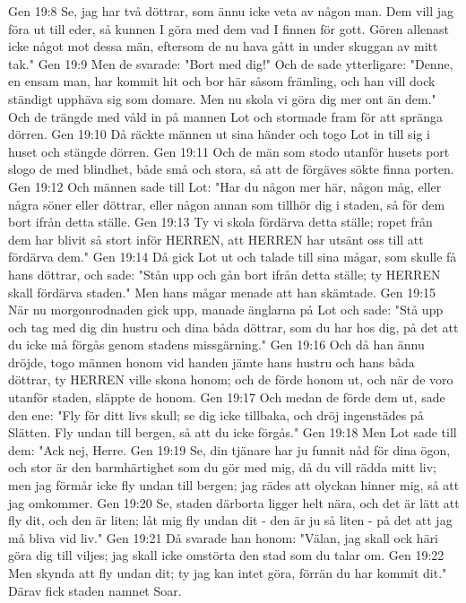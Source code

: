 Gen 19:8  Se, jag har två döttrar, som ännu icke veta av någon man. Dem vill jag föra ut till eder, så kunnen I göra med dem vad I finnen för gott. Gören allenast icke något mot dessa män, eftersom de nu hava gått in under skuggan av mitt tak."
Gen 19:9  Men de svarade: "Bort med dig!" Och de sade ytterligare: "Denne, en ensam man, har kommit hit och bor här såsom främling, och han vill dock ständigt upphäva sig som domare. Men nu skola vi göra dig mer ont än dem." Och de trängde med våld in på mannen Lot och stormade fram för att spränga dörren.
Gen 19:10  Då räckte männen ut sina händer och togo Lot in till sig i huset och stängde dörren.
Gen 19:11  Och de män som stodo utanför husets port slogo de med blindhet, både små och stora, så att de förgäves sökte finna porten.
Gen 19:12  Och männen sade till Lot: "Har du någon mer här, någon måg, eller några söner eller döttrar, eller någon annan som tillhör dig i staden, så för dem bort ifrån detta ställe.
Gen 19:13  Ty vi skola fördärva detta ställe; ropet från dem har blivit så stort inför HERREN, att HERREN har utsänt oss till att fördärva dem."
Gen 19:14  Då gick Lot ut och talade till sina mågar, som skulle få hans döttrar, och sade: "Stån upp och gån bort ifrån detta ställe; ty HERREN skall fördärva staden." Men hans mågar menade att han skämtade.
Gen 19:15  När nu morgonrodnaden gick upp, manade änglarna på Lot och sade: "Stå upp och tag med dig din hustru och dina båda döttrar, som du har hos dig, på det att du icke må förgås genom stadens missgärning."
Gen 19:16  Och då han ännu dröjde, togo männen honom vid handen jämte hans hustru och hans båda döttrar, ty HERREN ville skona honom; och de förde honom ut, och när de voro utanför staden, släppte de honom.
Gen 19:17  Och medan de förde dem ut, sade den ene: "Fly för ditt livs skull; se dig icke tillbaka, och dröj ingenstädes på Slätten. Fly undan till bergen, så att du icke förgås."
Gen 19:18  Men Lot sade till dem: "Ack nej, Herre.
Gen 19:19  Se, din tjänare har ju funnit nåd för dina ögon, och stor är den barmhärtighet som du gör med mig, då du vill rädda mitt liv; men jag förmår icke fly undan till bergen; jag rädes att olyckan hinner mig, så att jag omkommer.
Gen 19:20  Se, staden därborta ligger helt nära, och det är lätt att fly dit, och den är liten; låt mig fly undan dit - den är ju så liten - på det att jag må bliva vid liv."
Gen 19:21  Då svarade han honom: "Välan, jag skall ock häri göra dig till viljes; jag skall icke omstörta den stad som du talar om.
Gen 19:22  Men skynda att fly undan dit; ty jag kan intet göra, förrän du har kommit dit." Därav fick staden namnet Soar.
